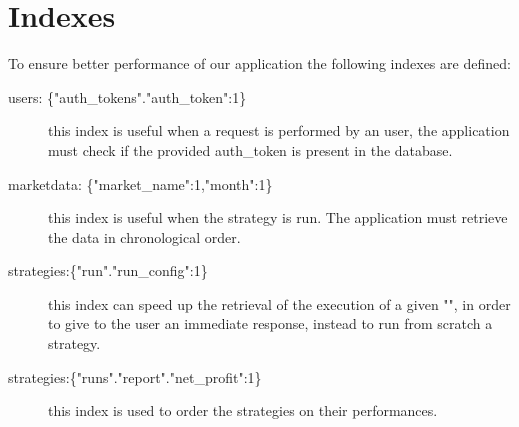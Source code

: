 \section{Indexes}\label{sec:indexes}

To ensure better performance of our application the following indexes are
defined:
\begin{description}
	\item[users: \{"auth\_tokens"."auth\_token":1\}] this index is useful
		when a request is performed by an user, the application must
		check if the provided auth\_token is present in the database.
	\item[marketdata: \{"market\_name":1,"month":1\}] this index is useful
		when the strategy is run. The application must retrieve the data
		in chronological order.
	\item[strategies:\{"run"."run\_config":1\}] this index can speed up the
		retrieval of the execution of a given "", in
		order to give to the user an immediate response, instead to run
		from scratch a strategy.
	\item[strategies:\{"runs"."report"."net\_profit":1\}] this index is used
		to order the strategies on their performances.
\end{description}
